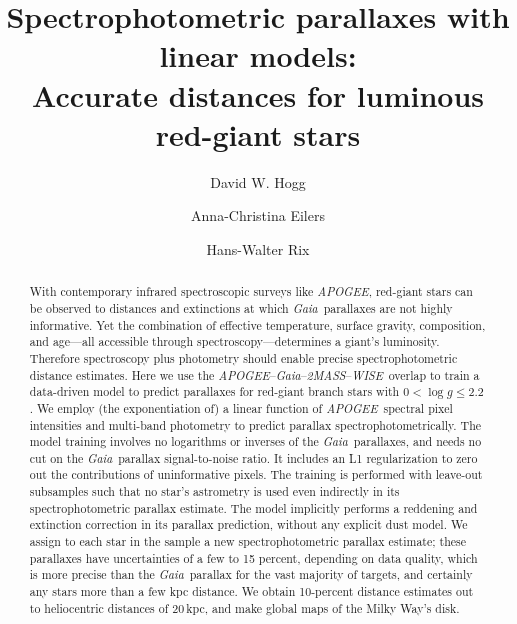 \documentclass[modern]{aastex62}
\newcommand{\acronym}[1]{{\small{#1}}}
\newcommand{\project}[1]{\textsl{#1}}
\newcommand{\apogee}{\project{\acronym{APOGEE}}}
\newcommand{\gaia}{\project{Gaia}}
\newcommand{\wise}{\project{\acronym{WISE}}}
\newcommand{\zmass}{\project{\acronym{2MASS}}}
\newcommand{\logg}{\log g}
\begin{document}
\sloppy\sloppypar\raggedbottom\frenchspacing %

\title{\textbf{%
Spectrophotometric parallaxes with linear models:\\
Accurate distances for luminous red-giant stars
}}

\author[0000-0003-2866-9403]{David W. Hogg}

\author[0000-0003-2895-6218]{Anna-Christina Eilers}

\author[0000-0003-4996-9069]{Hans-Walter Rix}

\begin{abstract}\noindent
With contemporary infrared spectroscopic surveys like \apogee,
red-giant stars can be observed to distances and extinctions
at which \gaia\ parallaxes are not highly informative.
Yet the combination of effective temperature, surface gravity, composition, and age---all
accessible through spectroscopy---determines a giant's luminosity.
Therefore spectroscopy plus photometry should enable 
precise spectrophotometric distance estimates.
Here we use the \apogee--\gaia--\zmass--\wise\ overlap to train a data-driven model
to predict parallaxes for red-giant branch stars with $0<\logg\leq2.2$.
We employ (the exponentiation of)
a linear function of \apogee\ spectral pixel intensities and multi-band photometry
to predict parallax spectrophotometrically.
The model training involves no logarithms or inverses of the \gaia\ parallaxes,
and needs no cut on the \gaia\ parallax signal-to-noise ratio.
It includes an L1 regularization to zero out the contributions of
uninformative pixels.
The training is performed
with leave-out subsamples such that no star's astrometry is used even indirectly in its
spectrophotometric parallax estimate.
The model implicitly performs a reddening and extinction correction in its parallax prediction,
without any explicit dust model.
We assign to each star in the sample a new spectrophotometric parallax estimate;
these parallaxes have uncertainties of a few to 15 percent, depending on data quality,
which is more precise than the \gaia\ parallax for the vast majority of targets, and
certainly any stars more than a few kpc distance.
We obtain 10-percent distance estimates out to heliocentric distances of 20\,kpc,
and make global maps of the Milky Way's disk.
\end{abstract}
\end{document}

